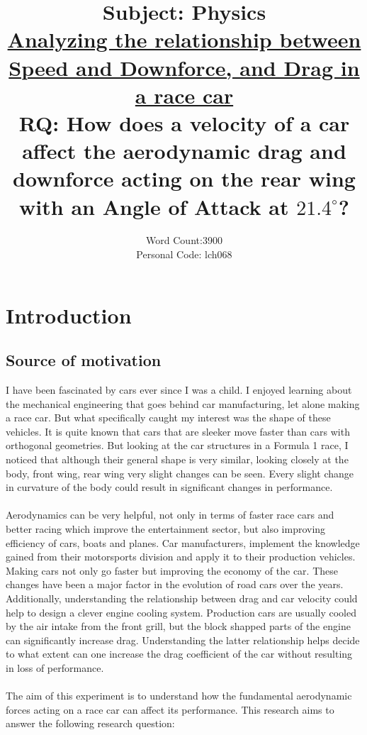 \documentclass[11pt, a4paper]{article}
\title{\textbf{Subject: Physics} \\[1ex] \Large \underline{Analyzing the relationship between Speed and Downforce, and Drag in a race car} \\ \large RQ: How does a velocity of a car affect the aerodynamic drag and downforce acting on the rear wing with an Angle of Attack at $21.4^{\circ}$?
}
\date{Word Count:3900\\Personal Code: lch068}
\begin{document}
\maketitle

\newpage
\tableofcontents
\clearpage
\section{Introduction}
\subsection{Source of motivation}
I have been fascinated by cars ever since I was a child. I enjoyed learning about the mechanical engineering that goes behind car manufacturing, let alone making a race car. But what
specifically caught my interest was the shape of these vehicles. It is quite known that cars that are sleeker move faster than cars with orthogonal geometries. But looking at the car structures in a Formula 1 race,
I noticed that although their general shape is very similar, looking closely at the body, front wing, rear wing very slight changes can be seen. Every slight change in curvature of the body could result in significant changes in performance.
\\\\
Aerodynamics can be very helpful, not only in terms of faster race cars and better racing which improve the entertainment sector, but also improving efficiency of cars, boats and planes. Car manufacturers, implement the knowledge gained from
their motorsports division and apply it to their production vehicles. Making cars not only go faster but improving the economy of the car. These changes have been a major factor in the evolution of road cars over the years.
Additionally, understanding the relationship between drag and car velocity could help to design a clever engine cooling system.
Production cars are usually cooled by the air intake from the front grill, but the block shapped parts of the engine can significantly increase drag.
Understanding the latter relationship helps decide to what extent can one increase the drag coefficient of the car without resulting in loss of performance.
\\\\
The aim of this experiment is to understand how the fundamental aerodynamic forces acting on a race car can affect its performance. This research aims to answer the following research question:
\end{document}
